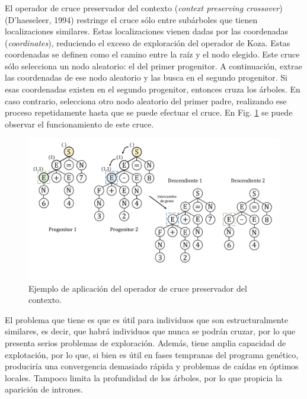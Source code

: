 \documentclass[spanish,a4paper,12pt,twoside]{report}
\begin{document}
        \subsubsection*{\vspace{-0.5cm}{\normalsize Operador de cruce preservador del contexto}}
        \vspace{-0.5cm}
        El operador de cruce preservador del contexto (\emph{context preserving crossover}) (D'haeseleer, 1994) restringe el cruce sólo entre subárboles que tienen localizaciones similares. Estas localizaciones vienen dadas por las coordenadas (\emph{coordinates}), reduciendo el exceso de exploración del operador de Koza. Estas coordenadas se definen como el camino entre la raíz y el nodo elegido. Este cruce sólo selecciona un nodo aleatorio: el del primer progenitor. A continuación, extrae las coordenadas de ese nodo aleatorio y las busca en el segundo progenitor. Si esas coordenadas existen en el segundo progenitor, entonces cruza los árboles. En caso contrario, selecciona otro nodo aleatorio del primer padre, realizando ese proceso repetidamente hasta que se puede efectuar el cruce. En Fig. \ref{fig:8} se puede observar el funcionamiento de este cruce. \par
        \begin{figure}[H]
          \centering
          \includegraphics[width = 1\textwidth]{resources/Fig8.pdf}
          \caption{Ejemplo de aplicación del operador de cruce preservador del contexto.}
          \label{fig:8}
        \end{figure} \par
        El problema que tiene es que es útil para individuos que son estructuralmente similares, es decir, que habrá individuos que nunca se podrán cruzar, por lo que presenta serios problemas de exploración. Además, tiene amplia capacidad de explotación, por lo que, si bien es útil en fases tempranas del programa genético, produciría una convergencia demasiado rápida y problemas de caídas en óptimos locales. Tampoco limita la profundidad de los árboles, por lo que propicia la aparición de intrones.
        
\end{document}

